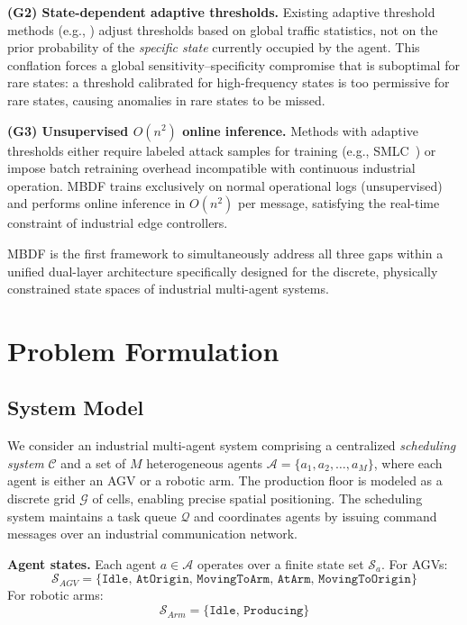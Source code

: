 \documentclass[manuscript,screen,review]{acmart}
\begin{document}
\textbf{(G2) State-dependent adaptive thresholds.}
Existing adaptive threshold methods (e.g.,
\cite{ref_spathoulas}) adjust thresholds based on global
traffic statistics, not on the prior probability of the
\emph{specific state} currently occupied by the agent.
This conflation forces a global sensitivity--specificity
compromise that is suboptimal for rare states: a threshold
calibrated for high-frequency states is too permissive for
rare states, causing anomalies in rare states to be missed.

\textbf{(G3) Unsupervised $O(n^2)$ online inference.}
Methods with adaptive thresholds either require labeled
attack samples for training (e.g., SMLC~\cite{ref9}) or
impose batch retraining overhead incompatible with
continuous industrial operation. MBDF trains exclusively
on normal operational logs (unsupervised) and performs
online inference in $O(n^2)$ per message, satisfying the
real-time constraint of industrial edge controllers.

MBDF is the first framework to simultaneously address all
three gaps within a unified dual-layer architecture
specifically designed for the discrete, physically
constrained state spaces of industrial multi-agent systems.

\section{Problem Formulation}
\label{sec:problem}

\subsection{System Model}
\label{subsec:sysmodel}

We consider an industrial multi-agent system comprising a
centralized \textit{scheduling system} $\mathcal{C}$ and a
set of $M$ heterogeneous agents
$\mathcal{A} = \{a_1, a_2, \ldots, a_M\}$, where each agent
is either an AGV or a robotic arm. The production floor is
modeled as a discrete grid $\mathcal{G}$ of cells, enabling
precise spatial positioning. The scheduling system maintains
a task queue $\mathcal{Q}$ and coordinates agents by issuing
command messages over an industrial communication network.

\textbf{Agent states.} Each agent $a \in \mathcal{A}$ operates
over a finite state set $\mathcal{S}_a$. For AGVs:
\begin{equation}
  \mathcal{S}_{AGV} = \{\texttt{Idle},\,\texttt{AtOrigin},\,
  \texttt{MovingToArm},\,\texttt{AtArm},\,\texttt{MovingToOrigin}\}
  \label{eq:agv_states}
\end{equation}
For robotic arms:
\begin{equation}
  \mathcal{S}_{Arm} = \{\texttt{Idle},\,\texttt{Producing}\}
  \label{eq:arm_states}
\end{equation}
\end{document}
